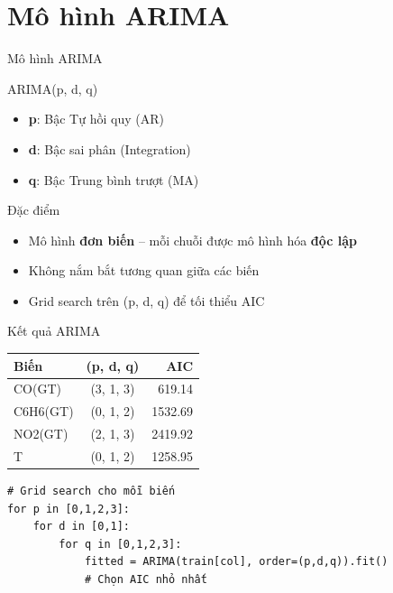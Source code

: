 \documentclass[serif, aspectratio=169]{beamer}
\newcommand{\highlight}[1]{\textbf{\color{hkustblue}#1}}
\begin{document}
\section{Mô hình ARIMA}

\begin{frame}{Mô hình ARIMA}
    \begin{block}{ARIMA(p, d, q)}
        \begin{itemize}
            \item \highlight{p}: Bậc Tự hồi quy (AR)
            \item \highlight{d}: Bậc sai phân (Integration)
            \item \highlight{q}: Bậc Trung bình trượt (MA)
        \end{itemize}
    \end{block}
    
    \vspace{0.4cm}
    \begin{alertblock}{Đặc điểm}
        \begin{itemize}
            \item Mô hình \highlight{đơn biến} -- mỗi chuỗi được mô hình hóa \highlight{độc lập}
            \item Không nắm bắt tương quan giữa các biến
            \item Grid search trên (p, d, q) để tối thiểu AIC
        \end{itemize}
    \end{alertblock}
\end{frame}

\begin{frame}{Kết quả ARIMA}
    \begin{center}
        \begin{tabular}{|l|c|r|}
            \hline
            \textbf{Biến} & \textbf{(p, d, q)} & \textbf{AIC} \\ \hline
            CO(GT) & (3, 1, 3) & 619.14 \\ \hline
            C6H6(GT) & (0, 1, 2) & 1532.69 \\ \hline
            NO2(GT) & (2, 1, 3) & 2419.92 \\ \hline
            T & (0, 1, 2) & 1258.95 \\ \hline
        \end{tabular}
    \end{center}
    
    \vspace{0.4cm}
    \begin{lstlisting}
# Grid search cho mỗi biến
for p in [0,1,2,3]:
    for d in [0,1]:
        for q in [0,1,2,3]:
            fitted = ARIMA(train[col], order=(p,d,q)).fit()
            # Chọn AIC nhỏ nhất
    \end{lstlisting}
\end{frame}
\end{document}
